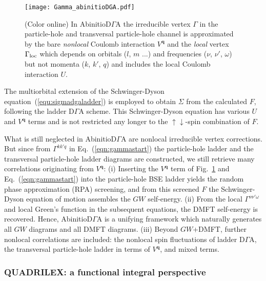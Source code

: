 \documentclass[rmp,aps,reprint,amsmath,amssymb,superscriptaddress,showpacs,nofootinbib]{revtex4-1}
\begin{document}
\begin{figure}
  \texttt{[image: Gamma\_abinitioDGA.pdf]}
    \caption{\label{Fig:AbinitioDGA} (Color online) In AbinitioD$\Gamma$A the irreducible vertex $\Gamma$ in the  particle-hole  and transversal particle-hole channel is approximated by the bare {\em nonlocal} Coulomb interaction $V^{\mathbf q}$ and the {\em local} vertex $\Gamma_{\rm loc}$ which depends on orbitals ($l$, $m$ ...)  and  frequencies ($\nu$, $\nu'$, $\omega$) but not momenta ($k$, $k'$, $q$) and  includes the local Coulomb interaction $U$.}
\end{figure}

The multiorbital extension \cite{Galler2016} of the Schwinger-Dyson equation~(\ref{equ:sigmadgaladder})  is employed to obtain $\Sigma$ from the calculated $F$, following the  ladder D$\Gamma$A scheme. This  Schwinger-Dyson equation has various $U$ and $V^ {\mathbf q}$ terms and is not restricted any longer to the $\uparrow\downarrow$-spin combination of $F$. 

What is still neglected in AbinitioD$\Gamma$A  are nonlocal irreducible vertex corrections. But since from $\Gamma^{{k}{k}'q}$ in Eq.~(\ref{eqn:gammastart}) the particle-hole ladder and the transversal particle-hole ladder diagrams are constructed, we still retrieve many correlations originating from ${{V}}^{\mathbf q}$: (i) Inserting the  $V^{\mathbf q}$ term of Fig.~\ref{Fig:AbinitioDGA} and Eq.~(\ref{eqn:gammastart})  into the particle-hole  BSE ladder yields the random phase approximation (RPA) screening, and  from this screened $F$ the  Schwinger-Dyson equation of motion assembles the $GW$ self-energy. (ii) From the local $\Gamma^{\nu\nu'\omega}$ and local Green's function in the subsequent equations, the DMFT self-energy is recovered. Hence,  AbinitioD$\Gamma$A is a unifying framework which naturally generates all  $GW$ diagrams and all DMFT diagrams. (iii) Beyond  $GW$+DMFT, further nonlocal correlations  are included: the nonlocal spin fluctuations of ladder D$\Gamma$A, the transversal particle-hole ladder in terms of  ${{V}}^{\mathbf q}$, and mixed terms.

\subsubsection{QUADRILEX: a functional integral perspective}
\label{sec:quadrilex}
\end{document}
